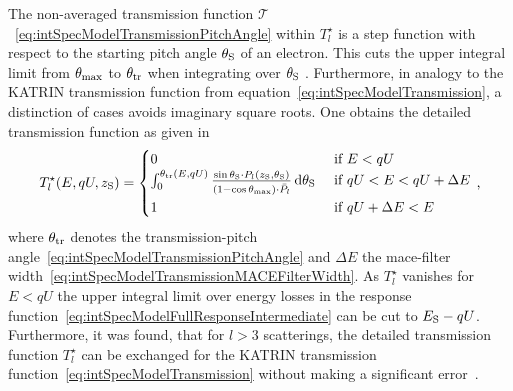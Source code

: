 The non-averaged transmission function $\mathcal{T}$~\eqref{eq:intSpecModelTransmissionPitchAngle} within $T_l^{\star}$ is a step function with respect to the starting pitch angle $\theta_\mathrm{S}$ of an electron. This cuts the upper integral limit from $\theta_\mathrm{max}$ to $\theta_\mathrm{tr}$ when integrating over $\theta_\mathrm{S}$ . Furthermore, in analogy to the KATRIN transmission function from equation~\eqref{eq:intSpecModelTransmission}, a distinction of cases avoids imaginary square roots. One obtains the detailed transmission function as given in~\cite{Groh2015,Kleesiek2019}
\begin{equation}
	\label{eq:intSpecModelDetailedTransmission}
	T_l^{\star}(E,qU,z_\mathrm{S}) =
	\begin{cases}
		0 &\text{ if } E < qU \\
		\int_{0}^{\theta_\mathrm{tr}(E,qU)}
		\frac{
			\sin\theta_\mathrm{S} \cdot
			P_l(z_\mathrm{S}, \theta_\mathrm{S})
		}{
			(1-\cos\theta_\mathrm{max}) \cdot \bar{P}_l \vphantom{\sum_i^i}
		} 
		\mathop{}\!\mathrm{d} \theta_\mathrm{S}
		&\text{ if } qU < E < qU + \Delta E \\
		1 &\text{ if } qU+\Delta E < E
	\end{cases}
	\text{\,,}
\end{equation}
where $\theta_\mathrm{tr}$ denotes the transmission-pitch angle~\eqref{eq:intSpecModelTransmissionPitchAngle} and $\Delta E$ the \gls{mace}-filter width~\eqref{eq:intSpecModelTransmissionMACEFilterWidth}. As $T_l^{\star}$ vanishes for $E<qU$ the upper integral limit over energy losses in the response function~\eqref{eq:intSpecModelFullResponseIntermediate} can be cut to $E_\mathrm{S}-qU$. Furthermore, it was found, that for $l>3$ scatterings, the detailed transmission function $T_l^{\star}$ can be exchanged for the KATRIN transmission function~\eqref{eq:intSpecModelTransmission} without making a significant error~\cite{Groh2015}.

